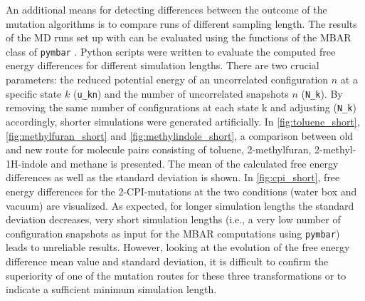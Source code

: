 An additional means for detecting differences between the outcome of the mutation algorithms is to compare runs of different sampling length. 
The results of the MD runs set up with {\trafo} can be evaluated using the functions of the MBAR class of \texttt{pymbar} \cite{Shirts.2008}. Python scripts were written to evaluate the computed free energy differences for different simulation lengths. There are two crucial parameters: the reduced potential energy of an uncorrelated configuration $n$ at a specific state $k$ (\texttt{u\_kn}) and the number of uncorrelated snapshots $n$ (\texttt{N\_k}). By removing the same number of configurations at each state k and adjusting (\texttt{N\_k}) accordingly, shorter simulations were generated artificially.
In \ref{fig:toluene_short}, \ref{fig:methylfuran_short} and \ref{fig:methylindole_short}, a comparison between old and new route for molecule pairs consisting of toluene, 2-methylfuran, 2-methyl-1H-indole and methane is presented. The mean of the calculated free energy differences as well as the standard deviation is shown. In \ref{fig:cpi_short}, free energy differences for the 2-CPI-mutations at the two conditions (water box and vacuum) are visualized. 
As expected, for longer simulation lengths the standard deviation decreases, very short simulation lengths (i.e., a very low number of configuration snapshots as input for the MBAR computations using \texttt{pymbar}) leads to unreliable results. However, looking at the evolution of the free energy difference mean value and standard deviation, it is difficult to confirm the superiority of one of the mutation routes for these three transformations or to indicate a sufficient minimum simulation length.



